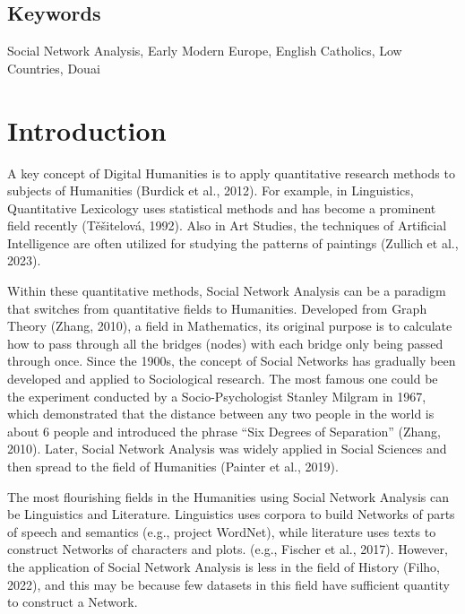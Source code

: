\documentclass[12pt,a4paper,oneside]{book}
\begin{document}
\begin{sloppypar}
\section*{Keywords}
Social Network Analysis, Early Modern Europe, English Catholics, Low Countries, Douai
\pagebreak

\tableofcontents
\pagebreak

\listoffigures
\listoftables

\newpage
\setcounter{page}{0}

\chapter{Introduction}
\label{introduction}
A key concept of Digital Humanities is to apply quantitative research methods to subjects of Humanities (Burdick et al., 2012). For example, in Linguistics, Quantitative Lexicology uses statistical methods and has become a prominent field recently (Těšitelová, 1992). Also in Art Studies, the techniques of Artificial Intelligence are often utilized for studying the patterns of paintings (Zullich et al., 2023).

Within these quantitative methods, Social Network Analysis can be a paradigm that switches from quantitative fields to Humanities. Developed from Graph Theory (Zhang, 2010), a field in Mathematics, its original purpose is to calculate how to pass through all the bridges (nodes) with each bridge only being passed through once. Since the 1900s, the concept of Social Networks has gradually been developed and applied to Sociological research. The most famous one could be the experiment conducted by a Socio-Psychologist Stanley Milgram in 1967, which demonstrated that the distance between any two people in the world is about 6 people and introduced the phrase “Six Degrees of Separation” (Zhang, 2010). Later, Social Network Analysis was widely applied in Social Sciences and then spread to the field of Humanities (Painter et al., 2019).

The most flourishing fields in the Humanities using Social Network Analysis can be Linguistics and Literature. Linguistics uses corpora to build Networks of parts of speech and semantics (e.g., project WordNet), while literature uses texts to construct Networks of characters and plots. (e.g., Fischer et al., 2017). However, the application of Social Network Analysis is less in the field of History (Filho, 2022), and this may be because few datasets in this field have sufficient quantity to construct a Network.


\end{sloppypar}
\end{document}
